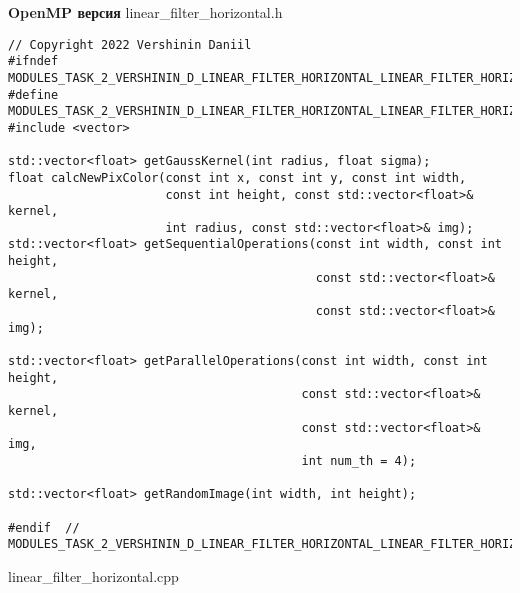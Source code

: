 \documentclass{report}
\begin{document}
\textbf{OpenMP версия}
\newline
\newline linear\_filter\_horizontal.h
\begin{lstlisting}
// Copyright 2022 Vershinin Daniil
#ifndef MODULES_TASK_2_VERSHININ_D_LINEAR_FILTER_HORIZONTAL_LINEAR_FILTER_HORIZONTAL_H_
#define MODULES_TASK_2_VERSHININ_D_LINEAR_FILTER_HORIZONTAL_LINEAR_FILTER_HORIZONTAL_H_
#include <vector>

std::vector<float> getGaussKernel(int radius, float sigma);
float calcNewPixColor(const int x, const int y, const int width,
                      const int height, const std::vector<float>& kernel,
                      int radius, const std::vector<float>& img);
std::vector<float> getSequentialOperations(const int width, const int height,
                                           const std::vector<float>& kernel,
                                           const std::vector<float>& img);

std::vector<float> getParallelOperations(const int width, const int height,
                                         const std::vector<float>& kernel,
                                         const std::vector<float>& img,
                                         int num_th = 4);

std::vector<float> getRandomImage(int width, int height);

#endif  // MODULES_TASK_2_VERSHININ_D_LINEAR_FILTER_HORIZONTAL_LINEAR_FILTER_HORIZONTAL_H_
\end{lstlisting}
linear\_filter\_horizontal.cpp
\end{document}
